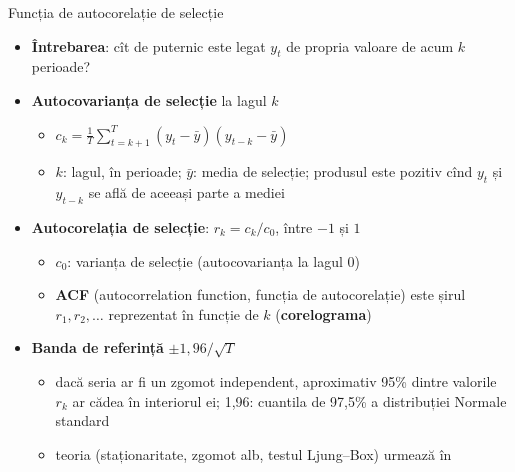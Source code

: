 \begin{frame}{Funcția de autocorelație de selecție}
\itemsize{\small}
\begin{itemize}
    \item \textbf{Întrebarea}: cît de puternic este legat $y_t$ de propria valoare de acum $k$ perioade?
    \item \textbf{Autocovarianța de selecție} la lagul $k$
    \begin{itemize}
        \item $c_k = \frac{1}{T} \sum_{t=k+1}^{T} (y_t - \bar y)(y_{t-k} - \bar y)$
        \item $k$: lagul, în perioade; $\bar y$: media de selecție; produsul este pozitiv cînd $y_t$ și $y_{t-k}$ se află de aceeași parte a mediei
    \end{itemize}
    \item \textbf{Autocorelația de selecție}: $r_k = c_k / c_0$, între $-1$ și $1$
    \begin{itemize}
        \item $c_0$: varianța de selecție (autocovarianța la lagul 0)
        \item \textbf{ACF} (autocorrelation function, funcția de autocorelație) este șirul $r_1, r_2, \ldots$ reprezentat în funcție de $k$ (\textbf{corelograma})
    \end{itemize}
    \item \textbf{Banda de referință} $\pm 1{,}96 / \sqrt{T}$
    \begin{itemize}
        \item dacă seria ar fi un zgomot independent, aproximativ 95\% dintre valorile $r_k$ ar cădea în interiorul ei; 1,96: cuantila de 97,5\% a distribuției Normale standard
        \item teoria (staționaritate, zgomot alb, testul Ljung--Box) urmează în 
    \end{itemize}
\end{itemize}
\end{frame}

